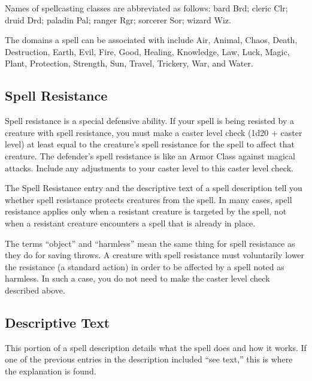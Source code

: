 Names of spellcasting classes are abbreviated as follows: bard Brd; cleric Clr; druid Drd; paladin Pal; ranger Rgr; sorcerer Sor; wizard Wiz.

The domains a spell can be associated with include Air, Animal, Chaos, Death, Destruction, Earth, Evil, Fire, Good, Healing, Knowledge, Law, Luck, Magic, Plant, Protection, Strength, Sun, Travel, Trickery, War, and Water.







\subsection{Spell Resistance}
Spell resistance is a special defensive ability. If your spell is being resisted by a creature with spell resistance, you must make a caster level check (1d20 + caster level) at least equal to the creature's spell resistance for the spell to affect that creature. The defender's spell resistance is like an Armor Class against magical attacks. Include any adjustments to your caster level to this caster level check.

The Spell Resistance entry and the descriptive text of a spell description tell you whether spell resistance protects creatures from the spell. In many cases, spell resistance applies only when a resistant creature is targeted by the spell, not when a resistant creature encounters a spell that is already in place.

The terms ``object'' and ``harmless'' mean the same thing for spell resistance as they do for saving throws. A creature with spell resistance must voluntarily lower the resistance (a standard action) in order to be affected by a spell noted as harmless. In such a case, you do not need to make the caster level check described above.

\subsection{Descriptive Text}
This portion of a spell description details what the spell does and how it works. If one of the previous entries in the description included ``see text,'' this is where the explanation is found.